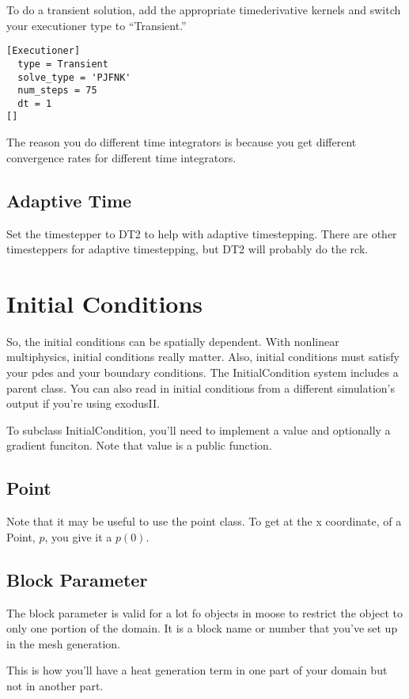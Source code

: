 To do a transient solution, add the appropriate timederivative kernels and 
switch your executioner type to ``Transient.'' 

\begin{verbatim}
[Executioner]
  type = Transient
  solve_type = 'PJFNK'
  num_steps = 75
  dt = 1
[]
\end{verbatim}

The reason you do different time integrators is because you get different 
convergence rates for different time integrators. 

\subsection{Adaptive Time}
Set the timestepper to DT2 to help with adaptive timestepping. There are other 
timesteppers for adaptive timestepping, but DT2 will probably do the rck. 

\section{Initial Conditions}

So, the initial conditions can be spatially dependent. With nonlinear 
multiphysics, initial conditions really matter. Also, initial conditions must 
satisfy your pdes and your boundary conditions. The InitialCondition system 
includes a parent class. You can also read in initial conditions from a 
different simulation's output if you're using exodusII.


To subclass InitialCondition, you'll need to implement a value and optionally a 
gradient funciton. Note that value is a public function. 

\subsection{Point}
Note that it may be useful to use the point class. To get at the x coordinate, 
of a Point, $p$, you give it a $p(0)$.

\subsection{Block Parameter}
The block parameter is valid for a lot fo objects in moose to restrict the 
object to only one portion of the domain. It is a block name or number that 
you've set up in the mesh generation.

This is how you'll have a heat generation term in one part of your domain but 
not in another part. 



